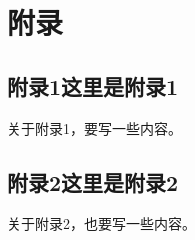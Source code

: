 

\chapter*{附\qquad{}录}

\appendix

{}
\section*{附录1\quad{}这里是附录1}
关于附录1，要写一些内容。

{}
\section*{附录2\quad{}这里是附录2}
关于附录2，也要写一些内容。
